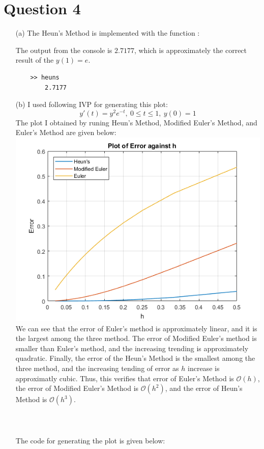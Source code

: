 \documentclass[11pt]{article}
\begin{document}
\section*{Question 4}
\begin{itemize}
	\item [(a)]
	The Heun’s Method is implemented with the function :
	
	The output from the console is $ \boxed{2.7177} $, which is approximately the correct result of the $ y(1) = e $.
	\begin{verbatim}
	>> heuns
	    2.7177
	\end{verbatim}
	
	\item [(b)]
	I used following IVP for generating this plot:
	\[ y'(t) = y^2e^{-t},\ 0\le t \le 1,\ y(0)=1 \]
	The plot I obtained by runing Heun's Method, Modified Euler's Method, and Euler's Method are given below:\\
	\includegraphics{error.png}\\
	We can see that the error of Euler's method is approximately linear, and it is the largest among the three method. The error of Modified Euler's method is smaller than Euler's method, and the increasing trending is approximately quadratic. Finally, the error of the Heun's Method is the smallest among the three method, and the increasing tending of error as $ h $ increase is approximatly cubic. Thus, this verifies that error of Euler's Method is $ \mathcal{O}(h) $, the error of Modified Euler's Method is $ \mathcal{O}(h^2) $, and the error of Heun's Method is $ \mathcal{O}(h^3) $.\\\\\\\\
	The code for generating the plot is given below:\\
	
	
\end{itemize}
\end{document}
